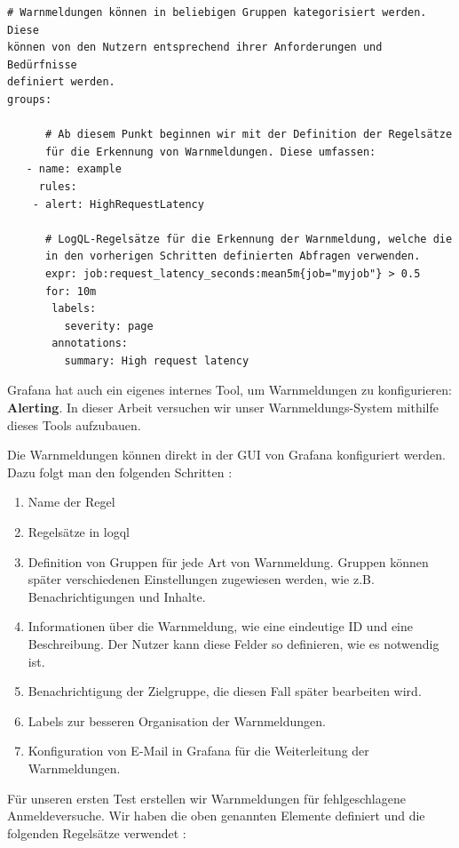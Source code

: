 {
\begin{Verbatim}[frame=single]
# Warnmeldungen können in beliebigen Gruppen kategorisiert werden. Diese
können von den Nutzern entsprechend ihrer Anforderungen und Bedürfnisse 
definiert werden.
groups:

      # Ab diesem Punkt beginnen wir mit der Definition der Regelsätze 
      für die Erkennung von Warnmeldungen. Diese umfassen:
   - name: example
     rules:
    - alert: HighRequestLatency

      # LogQL-Regelsätze für die Erkennung der Warnmeldung, welche die 
      in den vorherigen Schritten definierten Abfragen verwenden.
      expr: job:request_latency_seconds:mean5m{job="myjob"} > 0.5
      for: 10m
       labels:
         severity: page
       annotations:
         summary: High request latency
\end{Verbatim}
}


Grafana hat auch ein eigenes internes Tool, um Warnmeldungen zu konfigurieren: \textbf{Alerting}. In dieser Arbeit versuchen wir unser Warnmeldungs-System mithilfe dieses Tools aufzubauen.

Die Warnmeldungen können direkt in der \gls{GUI} von Grafana konfiguriert werden. Dazu folgt man den folgenden Schritten \citep{Grafana_alerting}:

{
\begin{enumerate}[noitemsep]
   \item Name der Regel
   \item Regelsätze in \gls{logql}
   \item Definition von Gruppen für jede Art von Warnmeldung. Gruppen können später verschiedenen Einstellungen zugewiesen werden, wie z.B. Benachrichtigungen und Inhalte.
   \item Informationen über die Warnmeldung, wie eine eindeutige ID und eine Beschreibung. Der Nutzer kann diese Felder so definieren, wie es notwendig ist.
   \item Benachrichtigung der Zielgruppe, die diesen Fall später bearbeiten wird.
   \item Labels zur besseren Organisation der Warnmeldungen.
   \item Konfiguration von E-Mail in Grafana für die Weiterleitung der Warnmeldungen.
\end{enumerate}
}

Für unseren ersten Test erstellen wir Warnmeldungen für fehlgeschlagene Anmeldeversuche. Wir haben die oben genannten Elemente definiert und die folgenden Regelsätze verwendet \citep{VoidQuark_sshlogs}:

